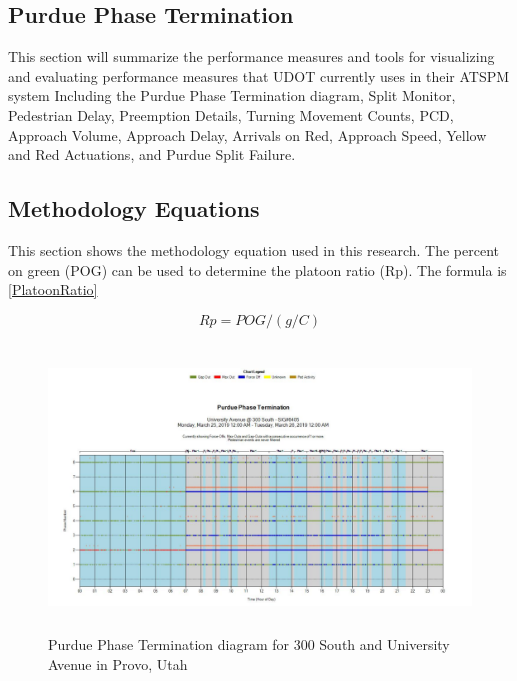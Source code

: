 \documentclass [12pt]{article}
\begin{document}
\subsection{Purdue Phase Termination}
This section will summarize the performance measures and tools for visualizing and evaluating performance measures that UDOT currently uses in their ATSPM system Including the Purdue Phase Termination diagram, Split Monitor, Pedestrian Delay, Preemption Details, Turning Movement Counts, PCD, Approach Volume, Approach Delay, Arrivals on Red, Approach Speed, Yellow and Red Actuations, and Purdue Split Failure.

\subsection{Methodology Equations}

This section shows the methodology equation used in this research. The percent on green (POG) can be used to determine the platoon ratio (Rp). The formula is \ref{PlatoonRatio} 

\begin{equation}
    Rp = POG/(g/C)
    \label{PlatoonRatio}
\end{equation}

\begin{figure}[ht]
    \centering
    \includegraphics[height=3in]{1.png}
    \caption{Purdue Phase Termination diagram for 300 South and University Avenue in Provo, Utah}
    \label{fig:my_label}
\end{figure}







\end{document}
